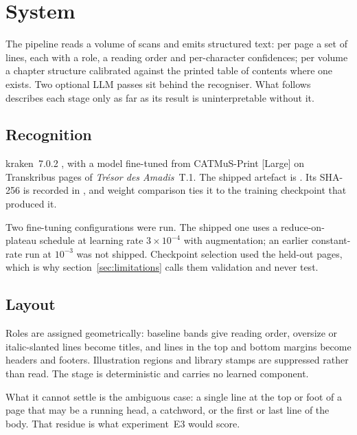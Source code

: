 \section{System}
\label{sec:system}

The pipeline reads a volume of scans and emits structured text: per page a set
of lines, each with a role, a reading order and per-character confidences; per
volume a chapter structure calibrated against the printed table of contents
where one exists. Two optional LLM passes sit behind the recogniser. What
follows describes each stage only as far as its result is uninterpretable
without it.

\subsection{Recognition}

kraken~7.0.2 \cite{kiessling2025kraken}, with a model fine-tuned from
CATMuS-Print [Large] \cite{gabay2024catmusprintlarge} on \trainPages{}
Transkribus pages of \emph{Trésor des Amadis}~T.1. The shipped artefact is
. Its SHA-256 is recorded in
, and weight comparison ties it to the training
checkpoint that produced it.

Two fine-tuning configurations were run. The shipped one uses a
reduce-on-plateau schedule at learning rate $3\times10^{-4}$ with
augmentation; an earlier constant-rate run at $10^{-3}$ was not shipped. Checkpoint selection
used the held-out \trainPagesVal{} pages, which is why
section~\ref{sec:limitations} calls them validation and never test.

\subsection{Layout}

Roles are assigned geometrically: baseline bands give reading order, oversize
or italic-slanted lines become titles, and lines in the top and bottom margins
become headers and footers. Illustration regions and library stamps are
suppressed rather than read. The stage is deterministic and carries no learned
component.

What it cannot settle is the ambiguous case: a single line at the top or foot
of a page that may be a running head, a catchword, or the first or last line of
the body. That residue is what experiment~E3 would score.

